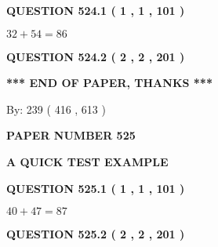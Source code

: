 \documentclass[12pt]{article}
\begin{document}
{\textbf{\Large{QUESTION
524.1 
 ( 1 , 1 , 101 )
}}}
  
  
 
 

$ %
32 +  %
54=   %
86$
 
 
  
\vspace{0.2in}
  
{\textbf{\Large{QUESTION
524.2 
 ( 2 , 2 , 201 )
}}}
  
  
   
   
 \vspace{0.2in}
 
   
   
   
   
\vspace{1.0in} 
{\textbf{\large{ *** END OF PAPER, THANKS *** }}} 
   
   
\hspace{1.0in} By: 
 239 ( 416 ,  613 )
   
   
   
   
\newpage 
\setcounter{page}{ 
   525001 } 
   
   
   
   
 {\textbf{ \Large{ PAPER NUMBER  525  }}}
   
   
\vspace{0.2in}
   
   
   
   
   
   
 \vspace{0.2in}
{\LARGE {\textbf{ A QUICK TEST EXAMPLE}}}
   
   
  
\vspace{0.2in}
  
{\textbf{\Large{QUESTION
525.1 
 ( 1 , 1 , 101 )
}}}
  
  
 
 

$ %
40 +  %
47=   %
87$
 
 
  
\vspace{0.2in}
  
{\textbf{\Large{QUESTION
525.2 
 ( 2 , 2 , 201 )
}}}
  
  
   
   
 \vspace{0.2in}
 
   
   
\end{document}
